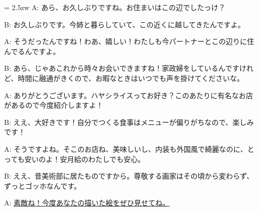 \documentclass[11pt]{amsart}
\title{}
\author{}
\newenvironment{hangall}[1]{\hangindent = 2.5zw\everypar{\hangindent = 2.5zw}}{}
\begin{document}
\maketitle
\begin{hangall}{}%
A: あら、お久しぶりですね。お住まいはこの辺でしたっけ？

B: お久しぶりです。今姉と暮らしていて、この近くに越してきたんですよ。

A: そうだったんですね！わあ、嬉しい！わたしも今パートナーとこの辺りに住んでるんですよ。

B: あら、じゃあこれから時々お会いできますね！家政婦をしているんですけれど、時間に融通がきくので、お暇なときはいつでも声を掛けてくださいな。

A: ありがとうございます。ハヤシライスってお好き？このあたりに有名なお店があるので今度紹介しますよ！

B: ええ、大好きです！自分でつくる食事はメニューが偏りがちなので、楽しみです！

A: そうですよね。そこのお店ね、美味しいし、内装も外国風で綺麗なのに、とっても安いのよ！安月給のわたしでも安心。

B: ええ、昔美術部に居たものですから。尊敬する画家はその頃から変わらず、ずっとゴッホなんです。

A: \ul{素敵ね！今度あなたの描いた絵をぜひ見せてね。}\end{hangall}
\end{document}
